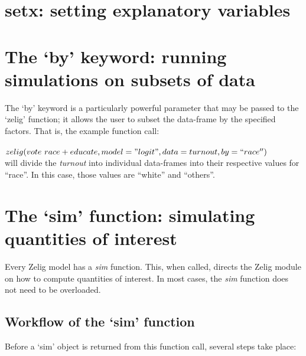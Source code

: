 \documentclass[a4paper, 11pt]{article}
\begin{document}
\section{setx: setting explanatory variables}


\section{The `by' keyword: running simulations on subsets of data}

The `by' keyword is a particularly powerful parameter that may be passed to the `zelig' function; it allows the user to subset the data-frame by the specified factors.  That is, the example function call: \\ \\
$ zelig(vote ~ race + educate, model="logit", data=turnout, by=``race'') $ \\

will divide the \emph{turnout} into individual data-frames into their respective values for ``race''.  In this case, those values are ``white'' and ``others''.



\section{The `sim' function: simulating quantities of interest}

Every Zelig model has a \emph{sim} function.  This, when called, directs the Zelig module on how to compute quantities of interest.  In most cases, the \emph{sim} function does not need to be overloaded.

\subsection{Workflow of the `sim' function}

Before a `sim' object is returned from this function call, several steps take place:
\end{document}
